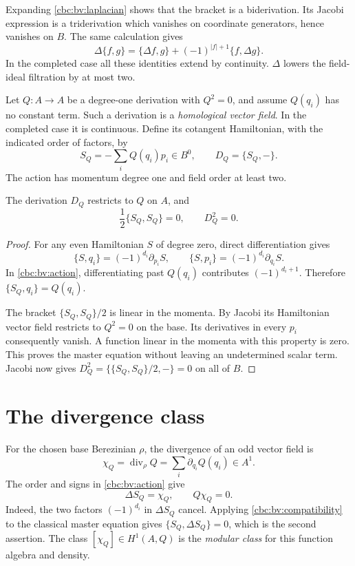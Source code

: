 Expanding \eqref{cbc:bv:laplacian} shows
that the bracket is a biderivation.  Its Jacobi expression is a
triderivation which vanishes on coordinate generators, hence vanishes
on $B$.  The same calculation gives
\begin{equation}\label{cbc:bv:compatibility}
 \Delta\{f,g\}=\{\Delta f,g\}+(-1)^{|f|+1}\{f,\Delta g\}.
\end{equation}
In the completed case all these identities extend by continuity.
$\Delta$ lowers the field-ideal filtration by at most two.

Let $Q:A\to A$ be a degree-one derivation with $Q^2=0$, and assume
$Q(q_i)$ has no constant term.  Such a derivation is a
\emph{homological vector field}.  In the completed case it is
continuous.  Define its cotangent Hamiltonian, with the indicated
order of factors, by
\begin{equation}\label{cbc:bv:action}
 S_Q=-\sum_i Q(q_i)p_i\in B^0,\qquad D_Q=\{S_Q,-\}.
\end{equation}
The action has momentum degree one and field order at least two.

\begin{theorem}\label{cbc:bv:cme}
The derivation $D_Q$ restricts to $Q$ on $A$, and
\[
 \frac12\{S_Q,S_Q\}=0,\qquad D_Q^2=0.
\]
\end{theorem}
\begin{proof}
For any even Hamiltonian $S$ of degree zero, direct differentiation gives
\[
 \{S,q_i\}=(-1)^{d_i}\partial_{p_i}S,\qquad
 \{S,p_i\}=(-1)^{d_i}\partial_{q_i}S.
\]
In \eqref{cbc:bv:action}, differentiating past $Q(q_i)$ contributes
$(-1)^{d_i+1}$.  Therefore $\{S_Q,q_i\}=Q(q_i)$.

The bracket $\{S_Q,S_Q\}/2$ is linear in the momenta.  By Jacobi its
Hamiltonian vector field restricts to $Q^2=0$ on the base.
Its derivatives in every $p_i$ consequently vanish.  A function linear
in the momenta with this property is zero.  This proves the master
equation without leaving an undetermined scalar term.
Jacobi now gives $D_Q^2=\{\{S_Q,S_Q\}/2,-\}=0$ on all of $B$.
\end{proof}

\section{The divergence class}
For the chosen base Berezinian $\rho$, the divergence of an odd vector
field is
\[
 \chi_Q=\operatorname{div}_{\rho}Q
       =\sum_i\partial_{q_i}Q(q_i)\in A^1.
\]
The order and signs in \eqref{cbc:bv:action} give
\begin{equation}\label{cbc:bv:divergence}
 \Delta S_Q=\chi_Q,\qquad Q\chi_Q=0.
\end{equation}
Indeed, the two factors $(-1)^{d_i}$ in
$\Delta S_Q$ cancel.  Applying
\eqref{cbc:bv:compatibility} to the classical master equation gives
$\{S_Q,\Delta S_Q\}=0$, which is the second assertion.
The class $[\chi_Q]\in H^1(A,Q)$ is the \emph{modular class}
for this function algebra and density.


